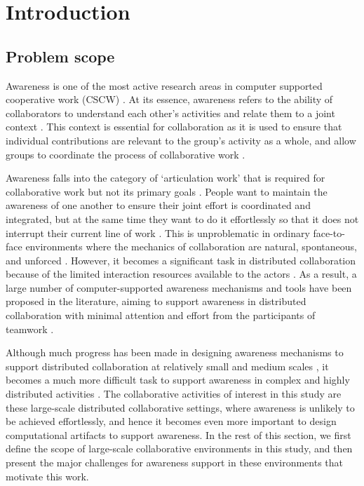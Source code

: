 \graphicspath{{Figures/}}

\chapter{Introduction} 
\label{chapter1:introduction}

\section{Problem scope}
\label{sec:problem_scope}
Awareness is one of the most active research areas in computer supported cooperative work (CSCW) \cite{dourish1992awareness,schmidt2002a,rittenbruch2009a}. At its essence, awareness refers to the ability of collaborators to understand each other's activities and relate them to a joint context \cite{rittenbruch2009a}. This context is essential for collaboration as it is used to ensure that individual contributions are relevant to the group's activity as a whole, and allow groups to coordinate the process of collaborative work \cite{dourish1992awareness}. 

Awareness falls into the category of `articulation work' that is required for collaborative work but not its primary goals \cite{schmidt1992taking}. People want to maintain the awareness of one another to ensure their joint effort is coordinated and integrated, but at the same time they want to do it effortlessly so that it does not interrupt their current line of work \cite{fussell1998coordination}. This is unproblematic in ordinary face-to-face environments where the mechanics of collaboration are natural, spontaneous, and unforced \cite{Gutwin2002}. However, it becomes a significant task in distributed collaboration because of the limited interaction resources available to the actors \cite{carroll2003a}. As a result, a large number of computer-supported awareness mechanisms and tools have been proposed in the literature, aiming to support awareness in distributed collaboration with minimal attention and effort from the participants of teamwork \cite{rittenbruch2009a,markopoulos2009design}.

Although much progress has been made in designing awareness mechanisms to support distributed collaboration at relatively small and medium scales \cite{antunes2010a}, it becomes a much more difficult task to support awareness in complex and highly distributed activities \cite{cabitza2009promoting}. The collaborative activities of interest in this study are these large-scale distributed collaborative settings, where awareness is unlikely to be achieved effortlessly, and hence it becomes even more important to design computational artifacts to support awareness. In the rest of this section, we first define the scope of large-scale collaborative environments in this study, and then present the major challenges for awareness support in these environments that motivate this work.

